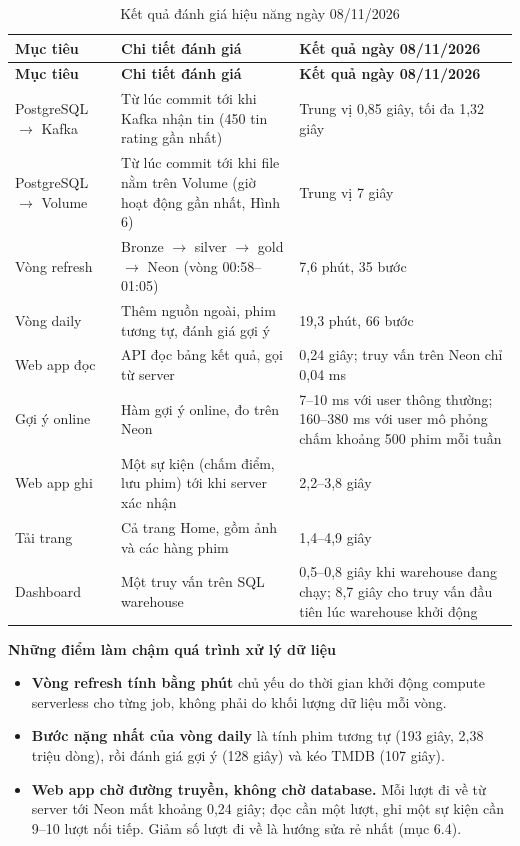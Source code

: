 \documentclass[a4paper,11pt]{article}
\newlength{\reporttablewidth}
\begin{document}
\begingroup
\small
{}
\setlength{\tabcolsep}{4pt}
\renewcommand{\arraystretch}{1.18}
\setlength{\reporttablewidth}{\dimexpr\linewidth-4\tabcolsep\relax}
\begin{longtable}{@{}L{0.28\reporttablewidth} L{0.35\reporttablewidth} L{0.37\reporttablewidth}@{}}
\caption[Kết quả đánh giá hiệu năng (mục 5.2)]{Kết quả đánh giá hiệu năng ngày 08/11/2026}\label{tab:18} \\
\toprule
\textbf{Mục tiêu} & \textbf{Chi tiết đánh giá} & \textbf{Kết quả ngày 08/11/2026} \\
\midrule
\endfirsthead
\toprule
\textbf{Mục tiêu} & \textbf{Chi tiết đánh giá} & \textbf{Kết quả ngày 08/11/2026} \\
\midrule
\endhead
\midrule
\endfoot
\bottomrule
\endlastfoot
PostgreSQL \ensuremath{\rightarrow} Kafka & Từ lúc commit tới khi Kafka nhận tin (450 tin rating gần nhất) & Trung vị 0,85 giây, tối đa 1,32 giây \\
PostgreSQL \ensuremath{\rightarrow} Volume & Từ lúc commit tới khi file nằm trên Volume (giờ hoạt động gần nhất, Hình 6) & Trung vị 7 giây \\
Vòng refresh & Bronze \ensuremath{\rightarrow} silver \ensuremath{\rightarrow} gold \ensuremath{\rightarrow} Neon (vòng 00:58--01:05) & 7,6 phút, 35 bước \\
Vòng daily & Thêm nguồn ngoài, phim tương tự, đánh giá gợi ý & 19,3 phút, 66 bước \\
Web app đọc & API đọc bảng kết quả, gọi từ server & 0,24 giây; truy vấn trên Neon chỉ 0,04 ms \\
Gợi ý online & Hàm gợi ý online, đo trên Neon & 7--10 ms với user thông thường; 160--380 ms với user mô phỏng chấm khoảng 500 phim mỗi tuần \\
Web app ghi & Một sự kiện (chấm điểm, lưu phim) tới khi server xác nhận & 2,2--3,8 giây \\
Tải trang & Cả trang Home, gồm ảnh và các hàng phim & 1,4--4,9 giây \\
Dashboard & Một truy vấn trên SQL warehouse & 0,5--0,8 giây khi warehouse đang chạy; 8,7 giây cho truy vấn đầu tiên lúc warehouse khởi động \\
\end{longtable}
\endgroup

\textbf{Những điểm làm chậm quá trình xử lý dữ liệu}

\begin{itemize}
  \item \textbf{Vòng refresh tính bằng phút} chủ yếu do thời gian khởi động compute serverless cho từng job, không phải do khối lượng dữ liệu mỗi vòng.
  \item \textbf{Bước nặng nhất của vòng daily} là tính phim tương tự (193 giây, 2,38 triệu dòng), rồi đánh giá gợi ý (128 giây) và kéo TMDB (107 giây).
  \item \textbf{Web app chờ đường truyền, không chờ database.} Mỗi lượt đi về từ server tới Neon mất khoảng 0,24 giây; đọc cần một lượt, ghi một sự kiện cần 9--10 lượt nối tiếp. Giảm số lượt đi về là hướng sửa rẻ nhất (mục 6.4).
\end{itemize}
\end{document}
